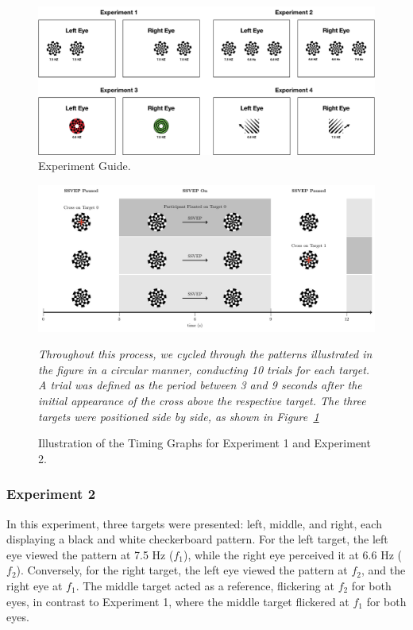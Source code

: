 \begin{figure}[h]
    \centering
    \includegraphics[width=1.0\textwidth]{images/experiments/experiments_w.png}
    \caption{Experiment Guide.}
    \label{fig:experiments}
\end{figure}

\begin{figure}[h]
    \centering
    \includegraphics[width=1.0\textwidth]{images/methods/timing.pdf}
    \caption{Illustration of the Timing Graphs for Experiment 1 and Experiment 2.}
    \emph{Throughout this process, we cycled through the patterns illustrated in the figure in a circular manner, conducting 10 trials for each target. A trial was defined as the period between 3 and 9 seconds after the initial appearance of the cross above the respective target. The three targets were positioned side by side, as shown in Figure~\ref{fig:experiments}}
    \label{fig:experiment-timing}
\end{figure}

\subsubsection{Experiment 2}
In this experiment, three targets were presented: left, middle, and right, each displaying a black and white checkerboard pattern. For the left target, the left eye viewed the pattern at 7.5 Hz ($f_{1}$), while the right eye perceived it at 6.6 Hz ($f_{2}$). Conversely, for the right target, the left eye viewed the pattern at $f_{2}$, and the right eye at $f_{1}$. The middle target acted as a reference, flickering at $f_{2}$ for both eyes, in contrast to Experiment 1, where the middle target flickered at $f_{1}$ for both eyes.

